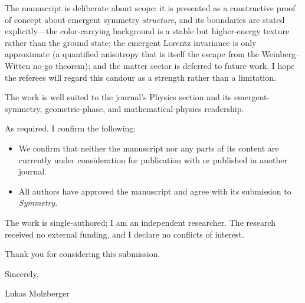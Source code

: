 \documentclass[10pt]{article}
\begin{document}
The manuscript is deliberate about scope: it is presented as a constructive proof of
concept about emergent symmetry \emph{structure}, and its boundaries are stated
explicitly---the color-carrying background is a stable but higher-energy texture rather
than the ground state; the emergent Lorentz invariance is only approximate (a
quantified anisotropy that is itself the escape from the Weinberg--Witten no-go
theorem); and the matter sector is deferred to future work. I hope the referees will
regard this candour as a strength rather than a limitation.

The work is well suited to the journal's Physics section and its emergent-symmetry,
geometric-phase, and mathematical-physics readership.

As required, I confirm the following:

\begin{itemize}
  \item We confirm that neither the manuscript nor any parts of its content are
  currently under consideration for publication with or published in another journal.
  \item All authors have approved the manuscript and agree with its submission to
  \textit{Symmetry}.
\end{itemize}

The work is single-authored; I am an independent researcher. The research received no
external funding, and I declare no conflicts of interest.

Thank you for considering this submission.

\vspace{0.5em}
\noindent Sincerely,

\vspace{1em}
\noindent Lukas Molzberger
\end{document}
